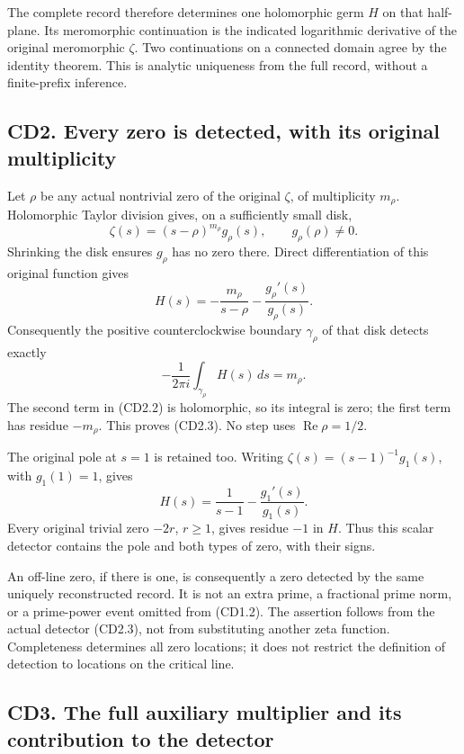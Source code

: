 \documentclass[
]{article}
\begin{document}
The complete record therefore determines one holomorphic germ \(H\) on
that half-plane. Its meromorphic continuation is the indicated
logarithmic derivative of the original meromorphic \(\zeta\). Two
continuations on a connected domain agree by the identity theorem. This
is analytic uniqueness from the full record, without a finite-prefix
inference.

\subsection{CD2. Every zero is detected, with its original
multiplicity}\label{cd2.-every-zero-is-detected-with-its-original-multiplicity}

Let \(\rho\) be any actual nontrivial zero of the original \(\zeta\), of
multiplicity \(m_\rho\). Holomorphic Taylor division gives, on a
sufficiently small disk, \[
\zeta(s)=(s-\rho)^{m_\rho}g_\rho(s),\qquad g_\rho(\rho)\ne0.
\tag{CD2.1}
\] Shrinking the disk ensures \(g_\rho\) has no zero there. Direct
differentiation of this original function gives \[
H(s)=-\frac{m_\rho}{s-\rho}
-\frac{g_\rho'(s)}{g_\rho(s)}.
\tag{CD2.2}
\] Consequently the positive counterclockwise boundary \(\gamma_\rho\)
of that disk detects exactly \[
-\frac1{2\pi i}\int_{\gamma_\rho}H(s)\,ds=m_\rho.
\tag{CD2.3}
\] The second term in (CD2.2) is holomorphic, so its integral is zero;
the first term has residue \(-m_\rho\). This proves (CD2.3). No step
uses \(\operatorname{Re}\rho=1/2\).

The original pole at \(s=1\) is retained too. Writing
\(\zeta(s)=(s-1)^{-1}g_1(s)\), with \(g_1(1)=1\), gives \[
H(s)=\frac1{s-1}-\frac{g_1'(s)}{g_1(s)}.
\tag{CD2.4}
\] Every original trivial zero \(-2r\), \(r\ge1\), gives residue \(-1\)
in \(H\). Thus this scalar detector contains the pole and both types of
zero, with their signs.

An off-line zero, if there is one, is consequently a zero detected by
the same uniquely reconstructed record. It is not an extra prime, a
fractional prime norm, or a prime-power event omitted from (CD1.2). The
assertion follows from the actual detector (CD2.3), not from
substituting another zeta function. Completeness determines all zero
locations; it does not restrict the definition of detection to locations
on the critical line.

\subsection{CD3. The full auxiliary multiplier and its contribution to
the
detector}\label{cd3.-the-full-auxiliary-multiplier-and-its-contribution-to-the-detector}
\end{document}
